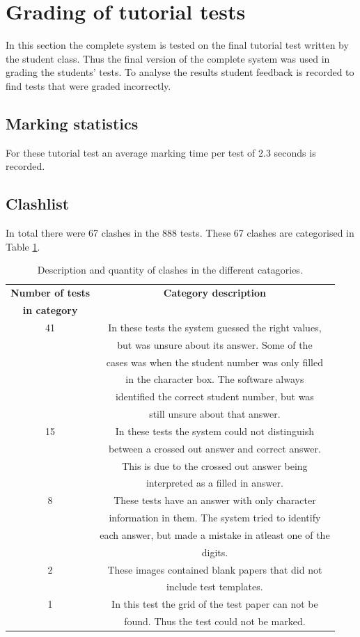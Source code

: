 \section{Grading of tutorial tests}
In this section the complete system is tested on the final tutorial test written by the student class. Thus the final version of the complete system was used in grading the students' tests. To analyse the results student feedback is recorded to find tests that were graded incorrectly. 

\subsection{Marking statistics}

For these tutorial test  an average marking time per test of 2.3 seconds is recorded.

\subsection{Clashlist}

In total there were 67 clashes in the 888 tests. These 67 clashes are categorised in Table  \ref{tbl:TutClash}.
\begin{table}
  \centering
\begin{tabular}{|c|c|}
\hline
\textbf{Number of tests} & \textbf{Category description}\\
\textbf{in category} &\\
\hline
41&In these tests the system guessed the right values,\\ 
&but was unsure about its answer. Some of the\\
&cases was when the student number was only filled\\
&in the character box. The software always\\
&identified the correct student number, but was\\
&still unsure about that answer.\\
\hline
15&In these tests the system could not distinguish\\ 
&between a crossed out answer and correct answer.\\
&This is due to the crossed out answer being\\
&interpreted as a filled in answer.\\
\hline
8&These tests have an answer with only character\\ 
&information in them. The system tried to identify\\
&each answer, but made a mistake in atleast one of the\\
&digits.\\
\hline
2&These images contained blank papers that did not\\ 
&include test templates.\\
\hline
1&In this test the grid of the test paper can not be\\ 
&found. Thus the test could not be marked.\\
\hline
\end{tabular}
  \caption{Description and quantity of clashes in the different catagories.} \label{tbl:TutClash}
\end{table}


